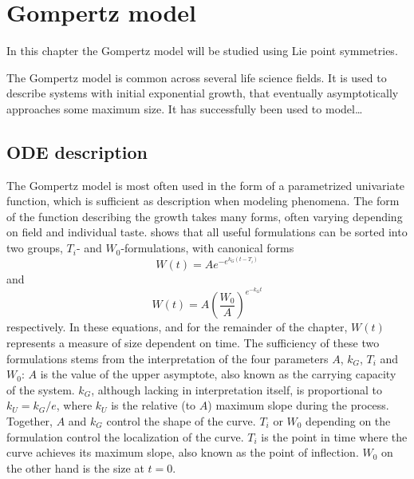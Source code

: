\chapter{Gompertz model}

In this chapter the Gompertz model will be studied using Lie point symmetries.

The Gompertz model is common across several life science fields.
It is used to describe systems with initial exponential growth, that eventually asymptotically approaches some maximum size.
It has successfully been used to model\dots

\section{ODE description}

The Gompertz model is most often used in the form of a parametrized univariate function, which is sufficient as description when modeling phenomena.
The form of the function describing the growth takes many forms, often varying depending on field and individual taste.
\cite{tjorve2017gompertz} shows that all useful formulations can be sorted into two groups, \(T_i\)- and \(W_0\)-formulations, with canonical forms
\begin{equation} \label{eq:gompertz-ti-function}
  W(t) = A e^{-e^{k_G(t-T_i)}}
\end{equation}
and
\begin{equation} \label{eq:gompertz-w0-function}
  W(t) = A \left(\frac{W_0}{A}\right)^{e^{-k_G t}}
\end{equation}
respectively.
In these equations, and for the remainder of the chapter, \(W(t)\) represents a measure of size dependent on time.
The sufficiency of these two formulations stems from the interpretation of the four parameters \(A\), \(k_G\), \(T_i\) and \(W_0\):
\(A\) is the value of the upper asymptote, also known as the carrying capacity of the system.
\(k_G\), although lacking in interpretation itself, is proportional to \(k_U = k_G / e\), where \(k_U\) is the relative (to \(A\)) maximum slope during the process.
Together, \(A\) and \(k_G\) control the shape of the curve.
\(T_i\) or \(W_0\) depending on the formulation control the localization of the curve.
\(T_i\) is the point in time where the curve achieves its maximum slope, also known as the point of inflection.
\(W_0\) on the other hand is the size at \(t=0\).

